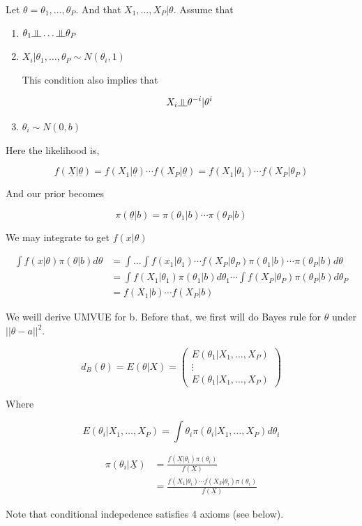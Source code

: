 \documentclass[11pt,fleqn]{book} %
\newcommand{\indep}{\rotatebox[origin=c]{90}{$\models$}}
\begin{document}
 \begin{example}
 	Let $\theta = \theta_1, \dots, \theta_P$.  And that $X_1, \dots, X_P|\theta $. Assume that

 			\begin{enumerate}
 				\item $\theta_1 \indep \dots \indep \theta_P$
 				\item $X_i|\theta_1, \dots, \theta_P \sim N(\theta_i, 1) $

 			This condition also implies that

 			$$X_i \indep \theta^{-i} | \theta^i $$
 			
 				\item $\theta_i \sim N(0, b)$ 
 			\end{enumerate}

 	Here the likelihood is, 

 				$$f(\underline{X}|\underline{\theta}) = f(X_1|\underline{\theta}) \cdots f(X_P|\underline{\theta}) = f(X_1|\theta_1) \cdots f(X_P|\theta_P) $$

 	And our prior becomes

 			
 			$$\pi(\underline{\theta}|b) = \pi(\theta_1|b) \cdots \pi(\theta_P|b)$$

 	We may integrate to get $f(x|\theta)$

 			\begin{align}
 				\int f(x|\theta)\pi(\theta|b) d\theta &= \int \dots \int f(x_1|\theta_1) \cdots f(X_P|\theta_P) \pi(\theta_1|b) \cdots \pi(\theta_P|b) d\theta\\
 					&=\int f(X_1|\theta_1) \pi(\theta_1|b) d\theta_1 \cdots \int f(X_P|\theta_P) \pi(\theta_P|b) d\theta_P\\
 					&= f(X_1|b)\cdots f(X_P|b)
 			\end{align}

 	We weill derive UMVUE for b. Before that, we first will do Bayes rule for $\theta$ under $||\theta - a||^2$. 

 			$$d_B(\theta) = E(\theta|X) = \begin{pmatrix}
 				E(\theta_1|X_1, \dots, X_P)\\
 				\vdots\\
 				E(\theta_1|X_1, \dots, X_P)
 			\end{pmatrix} $$

 	Where

 			$$E(\theta_i|X_1, \dots, X_P) = \int \theta_i \pi(\theta_i|X_1, \dots, X_P) d\theta_i $$

 			\begin{align*}
 				\pi(\theta_i|\underline{X}) &= \frac{f(\underline{X}|\theta_i) \pi(\theta_i)}{f(\underline{X})} \\
 					&=\frac{f(X_1|\theta_i) \cdots f(X_P|\theta_i) \pi(\theta_i)}{f(\underline{X})}
 			\end{align*}

 	Note that conditional indepedence satisfies 4 axioms (see below). 
 			
 \end{example}
\end{document}
